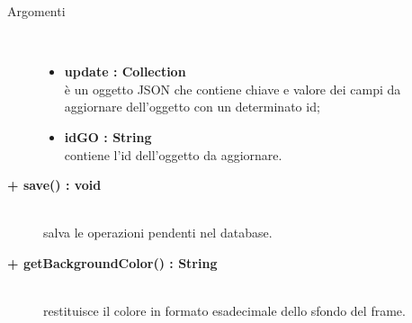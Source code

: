 \begin{description}
\begin{description}
\begin{description}
\begin{description}
			\item[Argomenti] \hfill \\
				\begin{itemize}
						\item \textbf{update : Collection			} \hfill \\
					è un oggetto JSON che contiene chiave e valore dei campi da aggiornare dell'oggetto con un determinato id;
					\item \textbf{idGO : String			} \hfill \\
					contiene l'id dell'oggetto da aggiornare.
				\end{itemize}

\end{description}

\end{description}

\begin{description} %
		\item[\textbf{+ save() : void			}] \hfill \\
			salva le operazioni pendenti nel database.  

\end{description}

\begin{description} %
		\item[\textbf{+ getBackgroundColor() : String			}] \hfill \\
			restituisce il colore in formato esadecimale dello sfondo del frame.     

\end{description}



\end{description}

\end{description}


